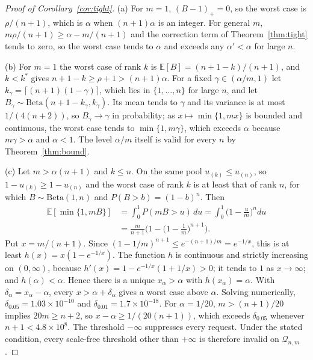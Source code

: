 \begin{proof}[Proof of Corollary~\ref{cor:tight}]
(a) For $m=1$, $(B-1)_+=0$, so the worst case is $\rho/(n+1)$, which is $\alpha$ when $(n+1)\alpha$ is an integer. For general $m$, $m\rho/(n+1)\ge\alpha-m/(n+1)$ and the correction term of Theorem~\ref{thm:tight} tends to zero, so the worst case tends to $\alpha$ and exceeds any $\alpha'<\alpha$ for large $n$.

(b) For $m=1$ the worst case of rank $k$ is $\mathbb{E}[B]=(n+1-k)/(n+1)$, and $k<k^\ast$ gives $n+1-k\ge\rho+1>(n+1)\alpha$. For a fixed $\gamma\in(\alpha/m,1)$ let $k_\gamma=\lceil(n+1)(1-\gamma)\rceil$, which lies in $\{1,\dots,n\}$ for large $n$, and let $B_\gamma\sim\mathrm{Beta}(n+1-k_\gamma,k_\gamma)$. Its mean tends to $\gamma$ and its variance is at most $1/(4(n+2))$, so $B_\gamma\to\gamma$ in probability; as $x\mapsto\min\{1,mx\}$ is bounded and continuous, the worst case tends to $\min\{1,m\gamma\}$, which exceeds $\alpha$ because $m\gamma>\alpha$ and $\alpha<1$. The level $\alpha/m$ itself is valid for every $n$ by Theorem~\ref{thm:bound}.

(c) Let $m>\alpha(n+1)$ and $k\le n$. On the same pool $u_{(k)}\le u_{(n)}$, so $1-u_{(k)}\ge1-u_{(n)}$ and the worst case of rank $k$ is at least that of rank $n$, for which $B\sim\mathrm{Beta}(1,n)$ and $P(B>b)=(1-b)^n$. Then
\begin{align*}
\mathbb{E}[\min\{1,mB\}]&=\int_0^1P(mB>u)\,du=\int_0^1\Big(1-\frac um\Big)^n du\\
&=\frac{m}{n+1}\Big(1-\Big(1-\frac1m\Big)^{n+1}\Big).
\end{align*}
Put $x=m/(n+1)$. Since $(1-1/m)^{n+1}\le e^{-(n+1)/m}=e^{-1/x}$, this is at least $h(x)=x(1-e^{-1/x})$. The function $h$ is continuous and strictly increasing on $(0,\infty)$, because $h'(x)=1-e^{-1/x}(1+1/x)>0$; it tends to $1$ as $x\to\infty$; and $h(\alpha)<\alpha$. Hence there is a unique $x_\alpha>\alpha$ with $h(x_\alpha)=\alpha$. With $\delta_\alpha=x_\alpha-\alpha$, every $x>\alpha+\delta_\alpha$ gives a worst case above $\alpha$. Solving numerically, $\delta_{0.05}=1.03\times10^{-10}$ and $\delta_{0.01}=1.7\times10^{-18}$. For $\alpha=1/20$, $m>(n+1)/20$ implies $20m\ge n+2$, so $x-\alpha\ge1/(20(n+1))$, which exceeds $\delta_{0.05}$ whenever $n+1<4.8\times10^8$. The threshold $-\infty$ suppresses every request. Under the stated condition, every scale-free threshold other than $+\infty$ is therefore invalid on $\mathcal{Q}_{n,m}$.
\end{proof}

